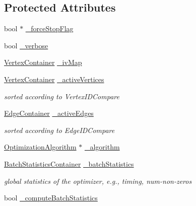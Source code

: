 \subsection*{Protected Attributes}
\begin{DoxyCompactItemize}
\item 
bool $\ast$ \hyperlink{classg2o_1_1SparseOptimizer_aac4a9f9b7d875ee40cae55f98d3437ab}{\+\_\+force\+Stop\+Flag}
\item 
bool \hyperlink{classg2o_1_1SparseOptimizer_a41b3803182a4db6c0ff8c8d4352dd149}{\+\_\+verbose}
\item 
\hyperlink{structg2o_1_1OptimizableGraph_a54f01b9b6071e65e6abeebe4afb29dec}{Vertex\+Container} \hyperlink{classg2o_1_1SparseOptimizer_a488b95a90a61454c787e9c13458e510b}{\+\_\+iv\+Map}
\item 
\hyperlink{structg2o_1_1OptimizableGraph_a54f01b9b6071e65e6abeebe4afb29dec}{Vertex\+Container} \hyperlink{classg2o_1_1SparseOptimizer_a805e1db97802980fa4dfef95cfa5e63e}{\+\_\+active\+Vertices}
\begin{DoxyCompactList}\small\item\em sorted according to Vertex\+I\+D\+Compare \end{DoxyCompactList}\item 
\hyperlink{structg2o_1_1OptimizableGraph_a2b43e807ae6d61ef8749ca1ef7c25f62}{Edge\+Container} \hyperlink{classg2o_1_1SparseOptimizer_a3207df163943bc1672fc7872964a6d6c}{\+\_\+active\+Edges}
\begin{DoxyCompactList}\small\item\em sorted according to Edge\+I\+D\+Compare \end{DoxyCompactList}\item 
\hyperlink{classg2o_1_1OptimizationAlgorithm}{Optimization\+Algorithm} $\ast$ \hyperlink{classg2o_1_1SparseOptimizer_a665d4ba54db76a1174bfc85a6dbc5127}{\+\_\+algorithm}
\item 
\hyperlink{namespaceg2o_a526b32fde21f83173acb2bb29db68275}{Batch\+Statistics\+Container} \hyperlink{classg2o_1_1SparseOptimizer_a21215378d9e8de28aee8d55b4d25ff89}{\+\_\+batch\+Statistics}
\begin{DoxyCompactList}\small\item\em global statistics of the optimizer, e.\+g., timing, num-\/non-\/zeros \end{DoxyCompactList}\item 
bool \hyperlink{classg2o_1_1SparseOptimizer_a3bd44c498c4d983c092f23673de14d5d}{\+\_\+compute\+Batch\+Statistics}
\end{DoxyCompactItemize}
